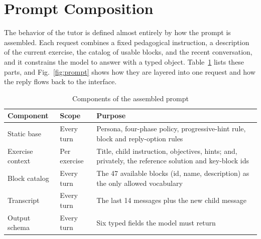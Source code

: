 \documentclass[conference]{IEEEtran}
\begin{document}
\section{Prompt Composition}
\label{sec:prompt}

The behavior of the tutor is defined almost entirely by how the prompt is assembled. Each request combines a fixed pedagogical instruction, a description of the current exercise, the catalog of usable blocks, and the recent conversation, and it constrains the model to answer with a typed object. Table~\ref{tab:prompt} lists these parts, and Fig.~\ref{fig:prompt} shows how they are layered into one request and how the reply flows back to the interface.

\begin{table}[!t]
\caption{Components of the assembled prompt}
\label{tab:prompt}
\centering
\renewcommand{\arraystretch}{1.25}
\begin{tabular}{@{}p{1.7cm}p{1.4cm}p{3.7cm}@{}}
\toprule
\textbf{Component} & \textbf{Scope} & \textbf{Purpose} \\
\midrule
Static base & Every turn & Persona, four-phase policy, progressive-hint rule, block and reply-option rules \\
Exercise context & Per exercise & Title, child instruction, objectives, hints; and, privately, the reference solution and key-block ids \\
Block catalog & Every turn & The 47 available blocks (id, name, description) as the only allowed vocabulary \\
Transcript & Every turn & The last 14 messages plus the new child message \\
Output schema & Every turn & Six typed fields the model must return \\
\bottomrule
\end{tabular}
\end{table}
\end{document}
